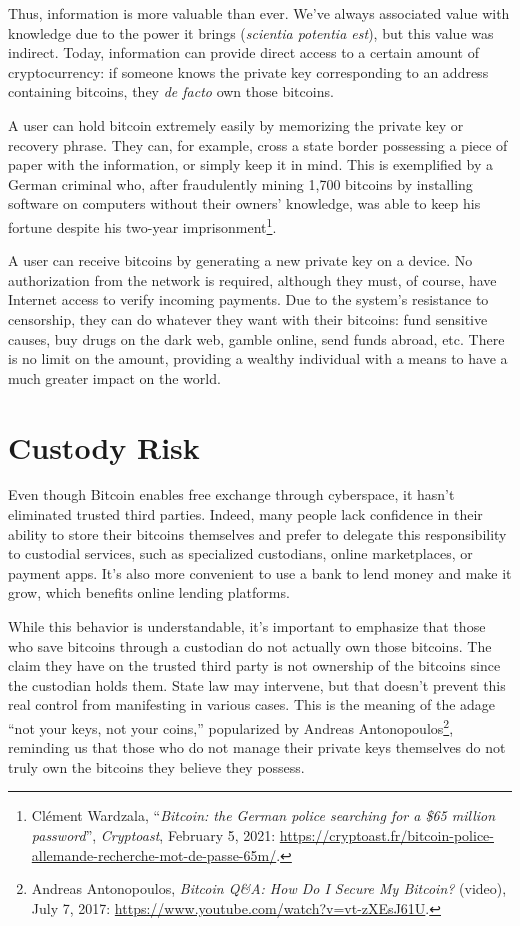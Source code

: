 \documentclass[
  a5paper,
  smalldemyvopaper,10pt,twoside,onecolumn,openright,extrafontsizes,hidelinks]{memoir}
\begin{document}
Thus, information is more valuable than ever. We've always associated
value with knowledge due to the power it brings (\emph{scientia potentia
est}), but this value was indirect. Today, information can provide
direct access to a certain amount of cryptocurrency: if someone knows
the private key corresponding to an address containing bitcoins, they
\emph{de facto} own those bitcoins.

A user can hold bitcoin extremely easily by memorizing the private key
or recovery phrase. They can, for example, cross a state border
possessing a piece of paper with the information, or simply keep it in
mind. This is exemplified by a German criminal who, after fraudulently
mining 1,700 bitcoins by installing software on computers without their
owners' knowledge, was able to keep his fortune despite his two-year
imprisonment\footnote{Clément Wardzala, ``\emph{Bitcoin: the German
  police searching for a \$65 million password}'', \emph{Cryptoast},
  February 5, 2021:
  \url{https://cryptoast.fr/bitcoin-police-allemande-recherche-mot-de-passe-65m/}.}.

A user can receive bitcoins by generating a new private key on a device.
No authorization from the network is required, although they must, of
course, have Internet access to verify incoming payments. Due to the
system's resistance to censorship, they can do whatever they want with
their bitcoins: fund sensitive causes, buy drugs on the dark web, gamble
online, send funds abroad, etc. There is no limit on the amount,
providing a wealthy individual with a means to have a much greater
impact on the world.

\section*{Custody Risk}\label{custody-risk}


Even though Bitcoin enables free exchange through cyberspace, it hasn't
eliminated trusted third parties. Indeed, many people lack confidence in
their ability to store their bitcoins themselves and prefer to delegate
this responsibility to custodial services, such as specialized
custodians, online marketplaces, or payment apps. It's also more
convenient to use a bank to lend money and make it grow, which benefits
online lending platforms.

While this behavior is understandable, it's important to emphasize that
those who save bitcoins through a custodian do not actually own those
bitcoins. The claim they have on the trusted third party is not
ownership of the bitcoins since the custodian holds them. State law may
intervene, but that doesn't prevent this real control from manifesting
in various cases. This is the meaning of the adage ``not your keys, not
your coins,'' popularized by Andreas Antonopoulos\footnote{Andreas
  Antonopoulos, \emph{Bitcoin Q\&A: How Do I Secure My Bitcoin?}
  (video), July 7, 2017:
  \url{https://www.youtube.com/watch?v=vt-zXEsJ61U}.}, reminding us that
those who do not manage their private keys themselves do not truly own
the bitcoins they believe they possess.
\end{document}
